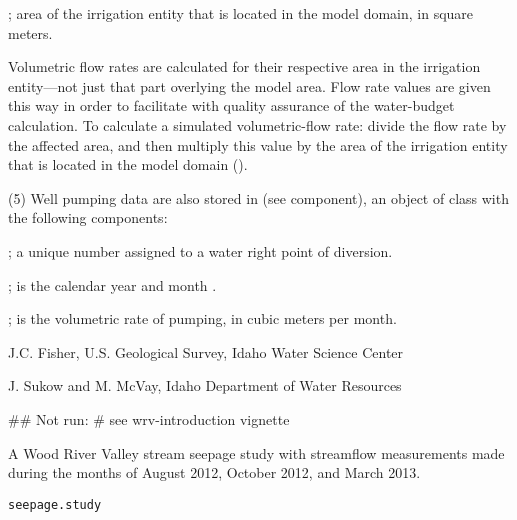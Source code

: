 \documentclass[letterpaper]{book}
\begin{document}
\begin{Value}
\begin{ldescription}
\item[\code{area.model}] ; area of the irrigation entity that is located in the model domain, in square meters.
\end{ldescription}
Volumetric flow rates are calculated for their respective area in the irrigation entity---not just that part overlying the model area.
Flow rate values are given this way in order to facilitate with quality assurance of the water-budget calculation.
To calculate a simulated volumetric-flow rate: divide the flow rate by the affected area, and then multiply this value by the area of the irrigation entity that is located in the model domain ().

(5) Well pumping data are also stored in  (see  component), an object of  class with the following components:
\begin{ldescription}
\item[\code{WMISNumber}] ; a unique number assigned to a water right point of diversion.
\item[\code{YearMonth}] ; is the calendar year and month .
\item[\code{Pumping}] ; is the volumetric rate of pumping, in cubic meters per month.
\end{ldescription}
\end{Value}
%
\begin{Author}\relax
J.C. Fisher, U.S. Geological Survey, Idaho Water Science Center

J. Sukow and M. McVay, Idaho Department of Water Resources
\end{Author}
%
\begin{SeeAlso}\relax
{}
\end{SeeAlso}
%
\begin{Examples}
\begin{ExampleCode}
## Not run: # see wrv-introduction vignette
\end{ExampleCode}
\end{Examples}
%
\begin{Description}\relax
A Wood River Valley stream seepage study with streamflow measurements made during the months of August 2012, October 2012, and March 2013.
\end{Description}
%
\begin{Usage}
\begin{verbatim}
seepage.study
\end{verbatim}
\end{Usage}
\end{document}
